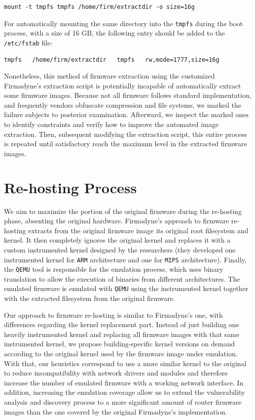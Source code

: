 \begin{verbatim}
mount -t tmpfs tmpfs /home/firm/extractdir -o size=16g
\end{verbatim}

For automatically mounting the same directory into the {\tt tmpfs} during the boot process, with a size of 16 GB, the following entry should be added to the {\tt /etc/fstab} file:

\begin{verbatim}
tmpfs   /home/firm/extractdir   tmpfs   rw,mode=1777,size=16g
\end{verbatim}

Nonetheless, this method of firmware extraction using the customized Firmadyne's \cite{firmadyne} extraction script is potentially incapable of automatically extract some firmware images. Because not all firmware follows standard implementation, and frequently vendors obfuscate compression and file systems, we marked the failure subjects to posterior examination. Afterward, we inspect the marked ones to identify constraints and verify how to improve the automated image extraction. Then, subsequent modifying the extraction script, this entire process is repeated until satisfactory reach the maximum level in the extracted firmware images.

\section{Re-hosting Process}
\label{sec:re-hosting}

We aim to maximize the portion of the original firmware during the re-hosting phase, absenting the original hardware. Firmadyne's approach to firmware re-hosting extracts from the original firmware image its original root filesystem and kernel. It then completely ignores the original kernel and replaces it with a custom instrumented kernel designed by the researchers (they developed one instrumented kernel for {\tt ARM} architecture and one for {\tt MIPS} architecture). Finally, the {\tt QEMU} tool is responsible for the emulation process, which uses binary translation to allow the execution of binaries from different architectures. The emulated firmware is emulated with {\tt QEMU} using the instrumented kernel together with the extracted filesystem from the original firmware.

Our approach to firmware re-hosting is similar to Firmadyne's one, with differences regarding the kernel replacement part. Instead of just building one heavily instrumented kernel and replacing all firmware images with that same instrumented kernel, we propose building-specific kernel versions on demand according to the original kernel used by the firmware image under emulation. With that, our heuristics correspond to use a more similar kernel to the original to reduce incompatibility with network drivers and modules and therefore increase the number of emulated firmware with a working network interface. In addition, increasing the emulation coverage allow us to extend the vulnerability analysis and discovery process to a more significant amount of router firmware images than the one covered by the original Firmadyne's implementation.

